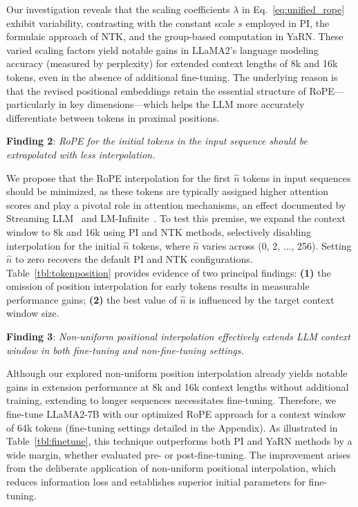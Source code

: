 Our investigation reveals that the scaling coefficients $\lambda$ in Eq.~\ref{eq:unified_rope} exhibit variability, contrasting with the constant scale $s$ employed in PI, the formulaic approach of NTK, and the group-based computation in YaRN. These varied scaling factors yield notable gains in LLaMA2's language modeling accuracy (measured by perplexity) for extended context lengths of 8k and 16k tokens, even in the absence of additional fine-tuning. The underlying reason is that the revised positional embeddings retain the essential structure of RoPE—particularly in key dimensions—which helps the LLM more accurately differentiate between tokens in proximal positions.

\textbf{Finding 2}: \textit{RoPE for the initial tokens in the input sequence should be extrapolated with less interpolation.} 

We propose that the RoPE interpolation for the first $\hat{n}$ tokens in input sequences should be minimized, as these tokens are typically assigned higher attention scores and play a pivotal role in attention mechanisms, an effect documented by Streaming LLM~\cite{streamingllm} and LM-Infinite~\cite{han2023lminfinite}. To test this premise, we expand the context window to 8k and 16k using PI and NTK methods, selectively disabling interpolation for the initial $\hat n$ tokens, where $\hat n$ varies across (0, 2, ..., 256). Setting $\hat n$ to zero recovers the default PI and NTK configurations. Table~\ref{tbl:tokenposition} provides evidence of two principal findings: \textbf{(1)} the omission of position interpolation for early tokens results in measurable performance gains; \textbf{(2)} the best value of $\hat n$ is influenced by the target context window size.

\textbf{Finding 3}: \textit{Non-uniform positional interpolation effectively extends LLM context window in both fine-tuning and non-fine-tuning settings.} 

Although our explored non-uniform position interpolation already yields notable gains in extension performance at 8k and 16k context lengths without additional training, extending to longer sequences necessitates fine-tuning. Therefore, we fine-tune LLaMA2-7B with our optimized RoPE approach for a context window of 64k tokens (fine-tuning settings detailed in the Appendix). As illustrated in Table~\ref{tbl:finetune}, this technique outperforms both PI and YaRN methods by a wide margin, whether evaluated pre- or post-fine-tuning. The improvement arises from the deliberate application of non-uniform positional interpolation, which reduces information loss and establishes superior initial parameters for fine-tuning.

